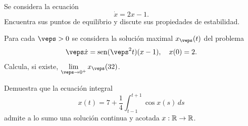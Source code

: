 \documentclass[12pt]{article}
\begin{document}
    \begin{ejercicio}
        Se considera la ecuación
        \[ \dot{x} = 2x - 1. \]
        Encuentra sus puntos de equilibrio y discute sus propiedades de estabilidad.
    \end{ejercicio}

    \begin{ejercicio}
        Para cada $\veps > 0$ se considera la solución maximal $x_{\veps}(t)$ del problema
        \[ \veps \dot{x} = \operatorname{sen}(\veps^2 t)(x - 1), \quad x(0) = 2. \]
        Calcula, si existe, $\lim\limits_{\veps \to 0^+} x_{\veps}(32)$.
    \end{ejercicio}

    \begin{ejercicio}
        Demuestra que la ecuación integral
        \[ x(t) = 7 + \frac{1}{4} \int_{t-1}^{t+1} \cos x(s) \, ds \]
        admite a lo sumo una solución continua y acotada $x : \mathbb{R} \to \mathbb{R}$.
    \end{ejercicio}

    \newpage
    \setcounter{ejercicio}{0} %
\end{document}
